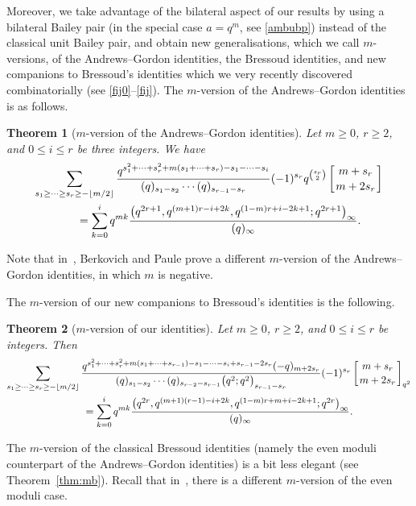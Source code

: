 \documentclass[pdftex]{sigma}
\numberwithin{equation}{section}
\newtheorem{Theorem}{Theorem}[section]
\begin{document}
Moreover, we take advantage of the bilateral aspect of our results by using a bilateral Bailey pair (in the special case $a=q^m$, see \eqref{ambubp}) instead of the classical unit Bailey pair, and obtain new generalisations, which we call $m$-versions, of the Andrews--Gordon identities, the Bressoud identities, and new companions to Bressoud's identities which we very recently discovered combinatorially \cite{DJK} (see \eqref{fij0}--\eqref{fij}).
The $m$-version of the Andrews--Gordon identities is as follows.
\begin{Theorem}[$m$-version of the Andrews--Gordon identities]\label{thm:mag}
Let $m\geq 0$, $r \geq 2$, and $0 \leq i \leq r$ be three integers. We have
\begin{gather}
\sum_{s_1\geq\dots\geq s_{r}\geq-\left\lfloor m/2\right\rfloor}\frac{q^{s_1^2+\dots+s_{r}^2+m(s_1+\dots+s_r)-s_1-\dots-s_i}}{(q)_{s_1-s_2}\cdots(q)_{s_{r-1}-s_r}}(-1)^{s_r}q^{\binom{s_r}{2}}\left[{m+s_r\atop m+2s_r}\right]\nonumber\\
\qquad=\sum_{k=0}^{i}q^{mk}\frac{\bigl(q^{2r+1},q^{(m+1)r-i+2k},q^{(1-m)r+i-2k+1};q^{2r+1}\bigr)_\infty}{(q)_\infty}.\label{mag}
\end{gather}
\end{Theorem}
Note that in~\cite[equation~(3.21)]{BP}, Berkovich and Paule prove a different $m$-version of the Andrews--Gordon identities, in which $m$ is negative.

The $m$-version of our new companions to Bressoud's identities is the following.
\begin{Theorem}[$m$-version of our identities]\label{thm:mfij}
Let $m\geq 0$, $r \geq 2$, and $0 \leq i \leq r$ be integers. Then
\begin{gather}
\sum_{s_1\geq\dots\geq s_{r}\geq-\left\lfloor m/2\right\rfloor}\frac{q^{s_1^2+\dots+s_{r}^2+m(s_1+\dots+s_{r-1})-s_1-\dots-s_{i}+s_{r-1}-2s_r}(-q)_{m+2s_r}}{(q)_{s_1-s_2}\cdots(q)_{s_{r-2}-s_{r-1}}\bigl(q^2;q^2\bigr)_{s_{r-1}-s_{r}}}(-1)^{s_r}\left[{m+s_r\atop m+2s_r}\right]_{q^2}\nonumber\\
\qquad=\sum_{k=0}^{i}q^{mk}\frac{\bigl(q^{2r},q^{(m+1)(r-1)-i+2k},q^{(1-m)r+m+i-2k+1};q^{2r}\bigr)_\infty}{(q)_\infty}.\label{mfij}
\end{gather}
\end{Theorem}

The $m$-version of the classical Bressoud identities (namely the even moduli counterpart of the Andrews--Gordon identities) is a bit less elegant (see Theorem~\ref{thm:mb}). Recall that in~\cite[p.~387]{W03}, there is a different $m$-version of the even moduli case.
\end{document}
